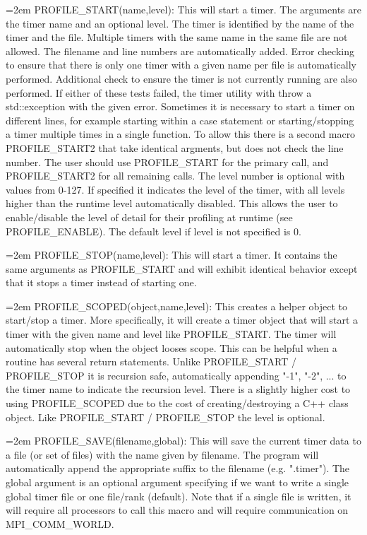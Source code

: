 \documentclass[fleqn,10pt,letterpaper]{article}
\begin{document}
\hangindent=2em\noindent
PROFILE\_START(name,level):  This will start a timer.  The arguments are the
    timer name and an optional level.  The timer is identified by the name
    of the timer and the file.  Multiple timers with the same name in the same 
    file are not allowed.  The filename and line numbers are automatically added.
    Error checking to ensure that there is only one timer with a given name per
    file is automatically performed.  Additional check to ensure the timer is not
    currently running are also performed.  If either of these tests failed, the 
    timer utility with throw a std::exception with the given error.  
    Sometimes it is necessary to start a timer on different lines, for example
    starting within a case statement or starting/stopping a timer multiple times
    in a single function.  To allow this there is a second macro PROFILE\_START2
    that take identical argments, but does not check the line number.  The user should
    use PROFILE\_START for the primary call, and PROFILE\_START2 for all remaining calls.
    The level number is optional with values from 0-127.  If specified it indicates 
    the level of the timer, with all levels higher than the runtime level automatically
    disabled.  This allows the user to enable/disable the level of detail for their 
    profiling at runtime (see PROFILE\_ENABLE).  The default level if level is not specified
    is 0.  

\hangindent=2em\noindent
PROFILE\_STOP(name,level):  This will start a timer.  It contains the same arguments
    as PROFILE\_START and will exhibit identical behavior except that it stops a
    timer instead of starting one.

\hangindent=2em\noindent
PROFILE\_SCOPED(object,name,level):  This creates a helper object to start/stop a timer.
    More specifically, it will create a timer object that will start a timer with the given
    name and level like PROFILE\_START.  The timer will automatically stop when the object
    looses scope.  This can be helpful when a routine has several return statements.  
    Unlike PROFILE\_START / PROFILE\_STOP it is recursion safe, automatically appending "-1",
    "-2", ... to the timer name to indicate the recursion level.  There is a slightly higher 
    cost to using PROFILE\_SCOPED due to the cost of creating/destroying a C++ class object.
    Like PROFILE\_START / PROFILE\_STOP the level is optional.  

\hangindent=2em\noindent
PROFILE\_SAVE(filename,global):  This will save the current timer data to a file (or set 
    of files) with the name given by filename.  The program will automatically append the
    appropriate suffix to the filename (e.g. ".timer").  The global argument is an optional
    argument specifying if we want to write a single global timer file or one file/rank (default).
    Note that if a single file is written, it will require all processors to call this macro
    and will require communication on MPI\_COMM\_WORLD.
\end{document}
